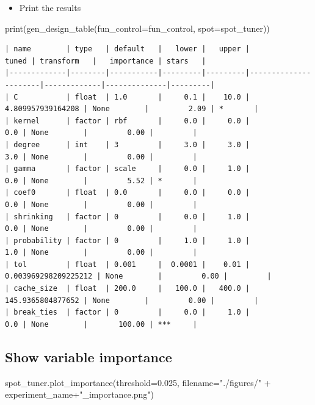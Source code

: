 \documentclass[
  letterpaper,
  DIV=11,
  numbers=noendperiod]{scrreprt}
\newenvironment{Shaded}{\begin{snugshade}}{\end{snugshade}}
\newcommand{\BuiltInTok}[1]{\textcolor[rgb]{0.00,0.23,0.31}{#1}}
\newcommand{\FloatTok}[1]{\textcolor[rgb]{0.68,0.00,0.00}{#1}}
\newcommand{\NormalTok}[1]{\textcolor[rgb]{0.00,0.23,0.31}{#1}}
\newcommand{\OperatorTok}[1]{\textcolor[rgb]{0.37,0.37,0.37}{#1}}
\newcommand{\StringTok}[1]{\textcolor[rgb]{0.13,0.47,0.30}{#1}}
\providecommand{\tightlist}{%
  \setlength{\itemsep}{0pt}\setlength{\parskip}{0pt}}\usepackage{longtable,booktabs,array}
\begin{document}
\begin{itemize}
\tightlist
\item
  Print the results
\end{itemize}

\begin{Shaded}
\begin{Highlighting}[]
\BuiltInTok{print}\NormalTok{(gen\_design\_table(fun\_control}\OperatorTok{=}\NormalTok{fun\_control,}
\NormalTok{    spot}\OperatorTok{=}\NormalTok{spot\_tuner))}
\end{Highlighting}
\end{Shaded}

\begin{verbatim}
| name        | type   | default   |   lower |   upper |                tuned | transform   |   importance | stars   |
|-------------|--------|-----------|---------|---------|----------------------|-------------|--------------|---------|
| C           | float  | 1.0       |     0.1 |    10.0 |    4.809957939164208 | None        |         2.09 | *       |
| kernel      | factor | rbf       |     0.0 |     0.0 |                  0.0 | None        |         0.00 |         |
| degree      | int    | 3         |     3.0 |     3.0 |                  3.0 | None        |         0.00 |         |
| gamma       | factor | scale     |     0.0 |     1.0 |                  0.0 | None        |         5.52 | *       |
| coef0       | float  | 0.0       |     0.0 |     0.0 |                  0.0 | None        |         0.00 |         |
| shrinking   | factor | 0         |     0.0 |     1.0 |                  0.0 | None        |         0.00 |         |
| probability | factor | 0         |     1.0 |     1.0 |                  1.0 | None        |         0.00 |         |
| tol         | float  | 0.001     |  0.0001 |    0.01 | 0.003969298209225212 | None        |         0.00 |         |
| cache_size  | float  | 200.0     |   100.0 |   400.0 |    145.9365804877652 | None        |         0.00 |         |
| break_ties  | factor | 0         |     0.0 |     1.0 |                  0.0 | None        |       100.00 | ***     |
\end{verbatim}

\hypertarget{show-variable-importance-3}{%
\subsection{Show variable importance}\label{show-variable-importance-3}}

\begin{Shaded}
\begin{Highlighting}[]
\NormalTok{spot\_tuner.plot\_importance(threshold}\OperatorTok{=}\FloatTok{0.025}\NormalTok{, filename}\OperatorTok{=}\StringTok{"./figures/"} \OperatorTok{+}\NormalTok{ experiment\_name}\OperatorTok{+}\StringTok{"\_importance.png"}\NormalTok{)}
\end{Highlighting}
\end{Shaded}
\end{document}

